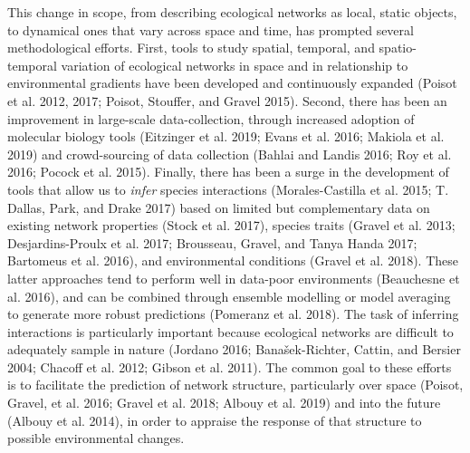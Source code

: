 \documentclass[11pt]{article}
\begin{document}
This change in scope, from describing ecological networks as local,
static objects, to dynamical ones that vary across space and time, has
prompted several methodological efforts. First, tools to study spatial,
temporal, and spatio-temporal variation of ecological networks in space
and in relationship to environmental gradients have been developed and
continuously expanded (Poisot et al. 2012, 2017; Poisot, Stouffer, and
Gravel 2015). Second, there has been an improvement in large-scale
data-collection, through increased adoption of molecular biology tools
(Eitzinger et al. 2019; Evans et al. 2016; Makiola et al. 2019) and
crowd-sourcing of data collection (Bahlai and Landis 2016; Roy et al.
2016; Pocock et al. 2015). Finally, there has been a surge in the
development of tools that allow us to \emph{infer} species interactions
(Morales-Castilla et al. 2015; T. Dallas, Park, and Drake 2017) based on
limited but complementary data on existing network properties (Stock et
al. 2017), species traits (Gravel et al. 2013; Desjardins-Proulx et al.
2017; Brousseau, Gravel, and Tanya Handa 2017; Bartomeus et al. 2016),
and environmental conditions (Gravel et al. 2018). These latter
approaches tend to perform well in data-poor environments (Beauchesne et
al. 2016), and can be combined through ensemble modelling or model
averaging to generate more robust predictions (Pomeranz et al. 2018).
The task of inferring interactions is particularly important because
ecological networks are difficult to adequately sample in nature
(Jordano 2016; Banašek-Richter, Cattin, and Bersier 2004; Chacoff et al.
2012; Gibson et al. 2011). The common goal to these efforts is to
facilitate the prediction of network structure, particularly over space
(Poisot, Gravel, et al. 2016; Gravel et al. 2018; Albouy et al. 2019)
and into the future (Albouy et al. 2014), in order to appraise the
response of that structure to possible environmental changes.
\end{document}
